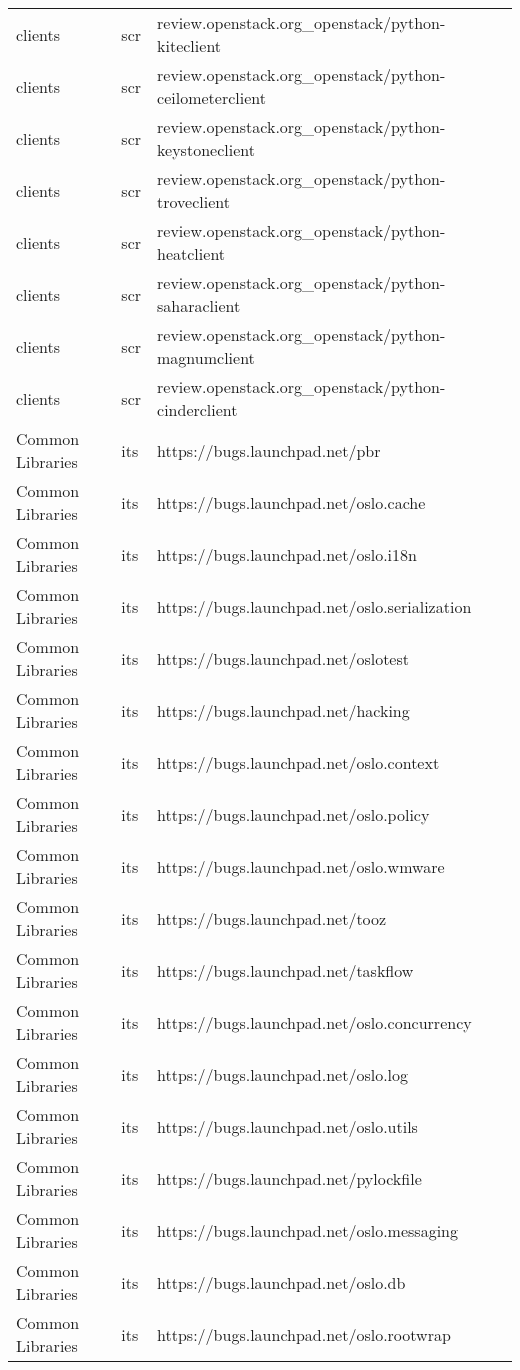 \begin{center}
\begin{longtable}{|p{4cm}|p{1cm}|p{10cm}|}
clients&scr&review.openstack.org\_openstack/python-kiteclient\\
clients&scr&review.openstack.org\_openstack/python-ceilometerclient\\
clients&scr&review.openstack.org\_openstack/python-keystoneclient\\
clients&scr&review.openstack.org\_openstack/python-troveclient\\
clients&scr&review.openstack.org\_openstack/python-heatclient\\
clients&scr&review.openstack.org\_openstack/python-saharaclient\\
clients&scr&review.openstack.org\_openstack/python-magnumclient\\
clients&scr&review.openstack.org\_openstack/python-cinderclient\\
Common Libraries&its&https://bugs.launchpad.net/pbr\\
Common Libraries&its&https://bugs.launchpad.net/oslo.cache\\
Common Libraries&its&https://bugs.launchpad.net/oslo.i18n\\
Common Libraries&its&https://bugs.launchpad.net/oslo.serialization\\
Common Libraries&its&https://bugs.launchpad.net/oslotest\\
Common Libraries&its&https://bugs.launchpad.net/hacking\\
Common Libraries&its&https://bugs.launchpad.net/oslo.context\\
Common Libraries&its&https://bugs.launchpad.net/oslo.policy\\
Common Libraries&its&https://bugs.launchpad.net/oslo.wmware\\
Common Libraries&its&https://bugs.launchpad.net/tooz\\
Common Libraries&its&https://bugs.launchpad.net/taskflow\\
Common Libraries&its&https://bugs.launchpad.net/oslo.concurrency\\
Common Libraries&its&https://bugs.launchpad.net/oslo.log\\
Common Libraries&its&https://bugs.launchpad.net/oslo.utils\\
Common Libraries&its&https://bugs.launchpad.net/pylockfile\\
Common Libraries&its&https://bugs.launchpad.net/oslo.messaging\\
Common Libraries&its&https://bugs.launchpad.net/oslo.db\\
Common Libraries&its&https://bugs.launchpad.net/oslo.rootwrap\\

\end{longtable}
\end{center}
